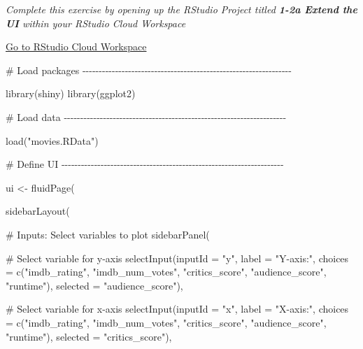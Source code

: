 \documentclass[
  letterpaper,
  DIV=11,
  numbers=noendperiod]{scrreprt}
\newenvironment{Shaded}{\begin{snugshade}}{\end{snugshade}}
\newcommand{\AttributeTok}[1]{\textcolor[rgb]{0.40,0.46,0.14}{#1}}
\newcommand{\CommentTok}[1]{\textcolor[rgb]{0.37,0.37,0.37}{#1}}
\newcommand{\FunctionTok}[1]{\textcolor[rgb]{0.28,0.35,0.67}{#1}}
\newcommand{\NormalTok}[1]{\textcolor[rgb]{0.00,0.46,0.62}{#1}}
\newcommand{\OtherTok}[1]{\textcolor[rgb]{0.00,0.46,0.62}{#1}}
\newcommand{\StringTok}[1]{\textcolor[rgb]{0.13,0.47,0.30}{#1}}
\begin{document}
\emph{Complete this exercise by opening up the RStudio Project titled
\textbf{1-2a Extend the UI} within your RStudio Cloud Workspace}

\href{https://rstudio.cloud/spaces/81721/join?access_code=I4VJaNsKfTqR3Td9hLP7E1nz8\%2FtMg6Xbw9Bgqumv}{
Go to RStudio Cloud Workspace}

\begin{Shaded}
\begin{Highlighting}[]
\CommentTok{\# Load packages {-}{-}{-}{-}{-}{-}{-}{-}{-}{-}{-}{-}{-}{-}{-}{-}{-}{-}{-}{-}{-}{-}{-}{-}{-}{-}{-}{-}{-}{-}{-}{-}{-}{-}{-}{-}{-}{-}{-}{-}{-}{-}{-}{-}{-}{-}{-}{-}{-}{-}{-}{-}{-}{-}{-}{-}{-}{-}{-}{-}{-}{-}{-}{-}}

\FunctionTok{library}\NormalTok{(shiny)}
\FunctionTok{library}\NormalTok{(ggplot2)}

\CommentTok{\# Load data {-}{-}{-}{-}{-}{-}{-}{-}{-}{-}{-}{-}{-}{-}{-}{-}{-}{-}{-}{-}{-}{-}{-}{-}{-}{-}{-}{-}{-}{-}{-}{-}{-}{-}{-}{-}{-}{-}{-}{-}{-}{-}{-}{-}{-}{-}{-}{-}{-}{-}{-}{-}{-}{-}{-}{-}{-}{-}{-}{-}{-}{-}{-}{-}{-}{-}{-}{-}}

\FunctionTok{load}\NormalTok{(}\StringTok{"movies.RData"}\NormalTok{)}

\CommentTok{\# Define UI {-}{-}{-}{-}{-}{-}{-}{-}{-}{-}{-}{-}{-}{-}{-}{-}{-}{-}{-}{-}{-}{-}{-}{-}{-}{-}{-}{-}{-}{-}{-}{-}{-}{-}{-}{-}{-}{-}{-}{-}{-}{-}{-}{-}{-}{-}{-}{-}{-}{-}{-}{-}{-}{-}{-}{-}{-}{-}{-}{-}{-}{-}{-}{-}{-}{-}{-}{-}}

\NormalTok{ui }\OtherTok{\textless{}{-}} \FunctionTok{fluidPage}\NormalTok{(}
  
  \FunctionTok{sidebarLayout}\NormalTok{(}
    
    \CommentTok{\# Inputs: Select variables to plot}
    \FunctionTok{sidebarPanel}\NormalTok{(}
      
      \CommentTok{\# Select variable for y{-}axis}
      \FunctionTok{selectInput}\NormalTok{(}\AttributeTok{inputId =} \StringTok{"y"}\NormalTok{, }
                  \AttributeTok{label =} \StringTok{"Y{-}axis:"}\NormalTok{,}
                  \AttributeTok{choices =} \FunctionTok{c}\NormalTok{(}\StringTok{"imdb\_rating"}\NormalTok{, }\StringTok{"imdb\_num\_votes"}\NormalTok{, }\StringTok{"critics\_score"}\NormalTok{, }\StringTok{"audience\_score"}\NormalTok{, }\StringTok{"runtime"}\NormalTok{), }
                  \AttributeTok{selected =} \StringTok{"audience\_score"}\NormalTok{),}
      
      \CommentTok{\# Select variable for x{-}axis}
      \FunctionTok{selectInput}\NormalTok{(}\AttributeTok{inputId =} \StringTok{"x"}\NormalTok{, }
                  \AttributeTok{label =} \StringTok{"X{-}axis:"}\NormalTok{,}
                  \AttributeTok{choices =} \FunctionTok{c}\NormalTok{(}\StringTok{"imdb\_rating"}\NormalTok{, }\StringTok{"imdb\_num\_votes"}\NormalTok{, }\StringTok{"critics\_score"}\NormalTok{, }\StringTok{"audience\_score"}\NormalTok{, }\StringTok{"runtime"}\NormalTok{), }
                  \AttributeTok{selected =} \StringTok{"critics\_score"}\NormalTok{),}
      

\end{Highlighting}
\end{Shaded}
\end{document}
